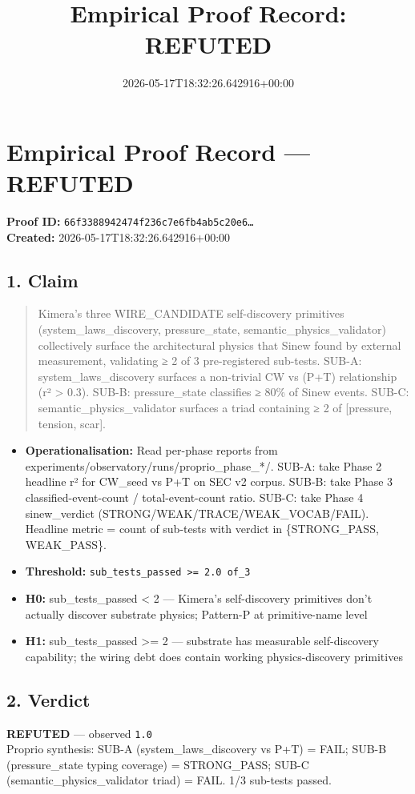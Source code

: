 \documentclass{article}
\title{Empirical Proof Record: REFUTED}
\date{2026-05-17T18:32:26.642916+00:00}
\begin{document}
\maketitle
\section*{Empirical Proof Record --- \textcolor{refuted}{\textbf{REFUTED}}}
\textbf{Proof ID:} \texttt{66f3388942474f236c7e6fb4ab5c20e6\dots}\\
\textbf{Created:} 2026-05-17T18:32:26.642916+00:00
\subsection*{1. Claim}
\begin{quote}Kimera's three WIRE\_CANDIDATE self-discovery primitives (system\_laws\_discovery, pressure\_state, semantic\_physics\_validator) collectively surface the architectural physics that Sinew found by external measurement, validating ≥ 2 of 3 pre-registered sub-tests. SUB-A: system\_laws\_discovery surfaces a non-trivial CW vs (P+T) relationship (r² > 0.3). SUB-B: pressure\_state classifies ≥ 80\% of Sinew events. SUB-C: semantic\_physics\_validator surfaces a triad containing ≥ 2 of [pressure, tension, scar].\end{quote}
\begin{itemize}
\item \textbf{Operationalisation:} Read per-phase reports from experiments/observatory/runs/proprio\_phase\_*/. SUB-A: take Phase 2 headline r² for CW\_seed vs P+T on SEC v2 corpus. SUB-B: take Phase 3 classified-event-count / total-event-count ratio. SUB-C: take Phase 4 sinew\_verdict (STRONG/WEAK/TRACE/WEAK\_VOCAB/FAIL). Headline metric = count of sub-tests with verdict in \{STRONG\_PASS, WEAK\_PASS\}.
\item \textbf{Threshold:} \texttt{sub\_tests\_passed >= 2.0 of\_3}
\item \textbf{H0:} sub\_tests\_passed < 2 — Kimera's self-discovery primitives don't actually discover substrate physics; Pattern-P at primitive-name level
\item \textbf{H1:} sub\_tests\_passed >= 2 — substrate has measurable self-discovery capability; the wiring debt does contain working physics-discovery primitives
\end{itemize}
\subsection*{2. Verdict}
\textcolor{refuted}{\textbf{REFUTED}} --- observed \texttt{1.0}\\
Proprio synthesis: SUB-A (system\_laws\_discovery vs P+T) = FAIL; SUB-B (pressure\_state typing coverage) = STRONG\_PASS; SUB-C (semantic\_physics\_validator triad) = FAIL. 1/3 sub-tests passed.
\end{document}
